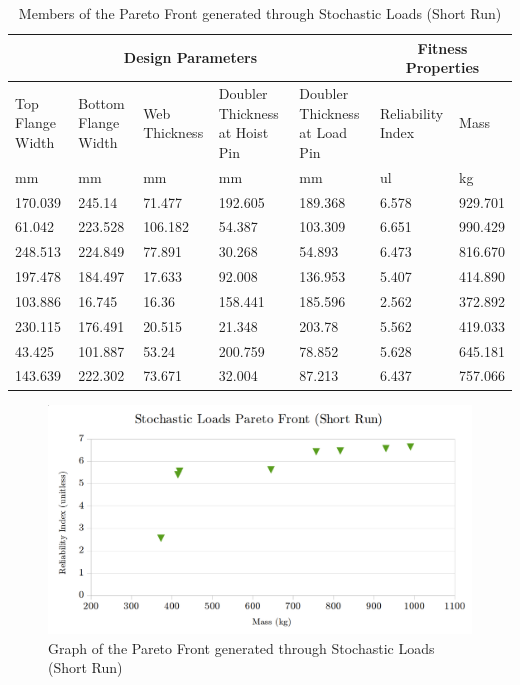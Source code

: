 \begin{table}[!htbp]
\centering
\small
\begin{tabular}{|p{1.5cm}p{1.5cm}p{1.4cm}p{2cm}p{2cm}||p{1.5cm}p{1.5cm}|}
\hline
\multicolumn{5}{|c||}{Design Parameters}&\multicolumn{2}{|c|}{Fitness Properties}\\
\hline
Top Flange Width&Bottom Flange Width&Web Thickness&Doubler Thickness at Hoist Pin&Doubler Thickness at Load Pin&Reliability Index& Mass\\
\hline
mm&mm&mm&mm&mm&ul&kg\\
\hline
170.039&245.14&71.477&192.605&189.368&6.578&929.701\\
61.042&223.528&106.182&54.387&103.309&6.651&990.429\\
248.513&224.849&77.891&30.268&54.893&6.473&816.670\\
197.478&184.497&17.633&92.008&136.953&5.407&414.890\\
103.886&16.745&16.36&158.441&185.596&2.562&372.892\\
230.115&176.491&20.515&21.348&203.78&5.562&419.033\\
43.425&101.887&53.24&200.759&78.852&5.628&645.181\\
143.639&222.302&73.671&32.004&87.213&6.437&757.066\\
\hline
\end{tabular}
	\caption{Members of the Pareto Front generated through Stochastic Loads (Short Run)}
\label{tab:pfront_sto_short}
\end{table}

\begin{figure}
\includegraphics[width=\textwidth]{img/pf_sto_short.png}
	\caption{Graph of the Pareto Front generated through Stochastic Loads (Short Run)}
\label{fig:pfront_sto_short}
\end{figure}


